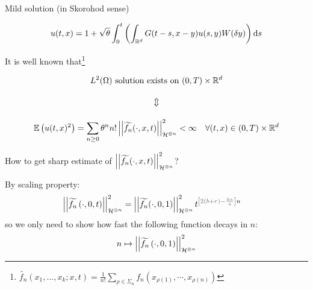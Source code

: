 \documentclass[9pt,table,xcolor=dvipsnames]{beamer}%
\begin{document}
\begin{frame}[fragile,t] %
  \begin{center}
    Mild solution (in Skorohod sense)
  \end{center}
  \begin{equation*}
    u(t,x) = 1 + \sqrt{\theta}\int_0^t \left( \int_{\mathbb{R}^d} G(t-s,x-y)u(s,y) W(\delta y) \right)\mathrm{d} s
  \end{equation*}
  \bigskip


  It is well known that\footnote{$\widetilde{f_n}(x_1,...,x_k; x, t) = \frac{1}{n!} \sum_{\rho \in \Sigma_n} f_n\left(x_{\rho(1)},\cdots, x_{\rho(n)}\right)$}

  \begin{gather*}
   \text{$L^2(\Omega)$ solution exists on $\left(0,T\right)\times\R^d$} \\[1em]
    \huge\Updownarrow                                                   \\[1em]
    \mathbb{E}\left(u(t,x)^2\right) = \sum_{n \ge 0} \theta^n n!  \Norm{\widetilde{f_n}(\cdot,x,t)}_{\mathcal{H}^{\otimes n}}^2<\infty \quad \forall (t,x) \in (0,T) \times \R^d
  \end{gather*}

\end{frame}
\begin{frame}[fragile,t] %
 \begin{center}
   How to get sharp estimate of $\left|\left| \widetilde{f_n}(\cdot,x,t) \right|\right|_{\mathcal{H}^{\otimes n}}^2$?
 \end{center}
 \pause
 \mySeparateLine
 \bigskip

 By scaling property:
 \begin{align*}
 \Norm{ \widetilde{f_n}\left(\cdot,0,t\right) }_{ \mathcal{H}^{\otimes n} }^2
    & = \Norm{ \widetilde{f_n}(\cdot,0,1) }_{ \mathcal{H}^{\otimes n} }^2  t^{ \textcolor{gray!80!black}{\left[ 2(b+r)-\frac{b \alpha}{a} \right]} n}
 \end{align*}
 so we only need to show how fast the following function decays in $n$:
 \begin{align*}
   n \mapsto \left|\left|  \widetilde{f_n}\left(\cdot,0,1\right)  \right|\right|_{ \mathcal{H}^{\otimes n} }^2
 \end{align*}
\end{frame}
\end{document}
